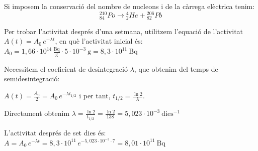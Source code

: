 \begin{solapartat}
 Si imposem la conservació del nombre de nucleons i de la càrrega elèctrica tenim:
\[ {}^{210}_{84}\mathit{Po} \rightarrow {}^{4}_{2}\mathit{He} + {}^{206}_{82}\mathit{Pb} \]

 Per trobar l'activitat després d'una setmana, utilitzem l'equació de l'activitat $A(t) = A_0\,e^{-\lambda t}$, en què l'activitat inicial és: $A_0 = 1,66\cdot 10^{14}\,\frac{\mathrm{Bq}}{\mathrm{g}}\cdot 5\cdot 10^{-3}\ \mathrm{g} = 8,3\cdot 10^{11}\ \mathrm{Bq}$

 Necessitem el coeficient de desintegració $\lambda$, que obtenim del temps de semidesintegració:

$A(t) = \frac{A_0}{2} = A_0\,e^{-\lambda t_{1/2}}$ i per tant, $t_{1/2} = \frac{\ln 2}{\lambda}$.

Directament obtenim $\lambda = \frac{\ln 2}{t_{1/2}} = \frac{\ln 2}{138} = 5,023\cdot 10^{-3}\ \mathrm{dies^{-1}}$

 L'activitat després de set dies és: $A = A_0\,e^{-\lambda t} = 8,3\cdot 10^{11}\,e^{-5,023\cdot 10^{-3}\cdot 7} = 8,01\cdot 10^{11}\ \mathrm{Bq}$
\end{solapartat}

